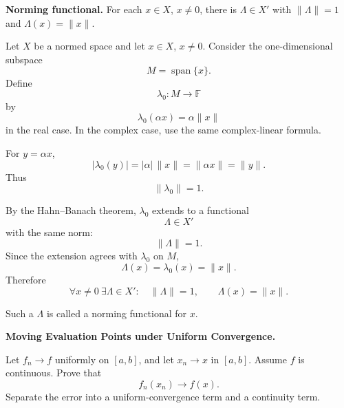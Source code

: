 \begin{problem}[CP-II-0151]
\label{prob:cp-ii-0151}
\textbf{Norming functional.} For each $x\in X$, $x\neq0$, there is $\Lambda\in X'$ with
		$\|\Lambda\|=1$ and $\Lambda(x)=\|x\|$.
\end{problem}

\begin{solution}
Let \(X\) be a normed space and let \(x\in X\), \(x\neq0\). Consider the one-dimensional
subspace
\[
M=\operatorname{span}\{x\}.
\]
Define
\[
\lambda_0:M\to\mathbb F
\]
by
\[
\lambda_0(\alpha x)=\alpha\|x\|
\]
in the real case. In the complex case, use the same complex-linear formula.

For \(y=\alpha x\),
\[
|\lambda_0(y)|
=
|\alpha|\,\|x\|
=
\|\alpha x\|
=
\|y\|.
\]
Thus
\[
\|\lambda_0\|=1.
\]

By the Hahn--Banach theorem, \(\lambda_0\) extends to a functional
\[
\Lambda\in X'
\]
with the same norm:
\[
\|\Lambda\|=1.
\]
Since the extension agrees with \(\lambda_0\) on \(M\),
\[
\Lambda(x)=\lambda_0(x)=\|x\|.
\]
Therefore
\[
\boxed{
\forall x\neq0\ \exists\Lambda\in X':
\quad
\|\Lambda\|=1,
\qquad
\Lambda(x)=\|x\|.
}
\]

Such a \(\Lambda\) is called a norming functional for \(x\).
\end{solution}


\begin{problem}[CP-II-0152]
\label{prob:cp-ii-0152}
\textbf{Moving Evaluation Points under Uniform Convergence.}

\hspace*{1.5em}Let \(f_n\to f\) uniformly on \([a,b]\), and let \(x_n\to x\) in \([a,b]\).
Assume \(f\) is continuous. Prove that
\[
f_n(x_n)\to f(x).
\]
Separate the error into a uniform-convergence term and a continuity term.
\end{problem}

